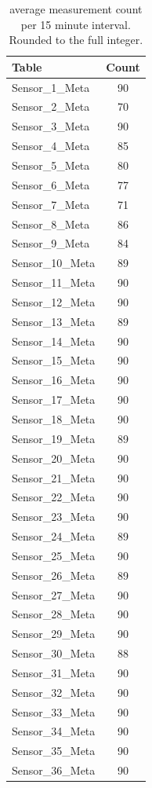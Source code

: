 \begin{table}
	\centering
	\begin{tabular}{l|c}
		Table & Count \\
		\hline
		 Sensor\_1\_Meta  & 90\\ \hline
		 Sensor\_2\_Meta  & 70\\ \hline
		 Sensor\_3\_Meta  & 90\\ \hline
		 Sensor\_4\_Meta  & 85\\ \hline
		 Sensor\_5\_Meta  & 80\\ \hline
		 Sensor\_6\_Meta  & 77\\ \hline
		 Sensor\_7\_Meta  & 71\\ \hline
		 Sensor\_8\_Meta  & 86\\ \hline
		 Sensor\_9\_Meta  & 84\\ \hline
		 Sensor\_10\_Meta  & 89\\ \hline
		 Sensor\_11\_Meta  & 90\\ \hline
		 Sensor\_12\_Meta  & 90\\ \hline
		 Sensor\_13\_Meta  & 89\\ \hline
		 Sensor\_14\_Meta  & 90\\ \hline
		 Sensor\_15\_Meta  & 90\\ \hline
		 Sensor\_16\_Meta  & 90\\ \hline
		 Sensor\_17\_Meta  & 90\\ \hline
		 Sensor\_18\_Meta  & 90\\ \hline
		 Sensor\_19\_Meta  & 89\\ \hline
		 Sensor\_20\_Meta  & 90\\ \hline 
		 Sensor\_21\_Meta  & 90\\ \hline
		 Sensor\_22\_Meta  & 90\\ \hline
		 Sensor\_23\_Meta  & 90\\ \hline
		 Sensor\_24\_Meta  & 89\\ \hline
		 Sensor\_25\_Meta  & 90\\ \hline
		 Sensor\_26\_Meta  & 89\\ \hline
		 Sensor\_27\_Meta  & 90\\ \hline
		 Sensor\_28\_Meta  & 90\\ \hline
		 Sensor\_29\_Meta  & 90\\ \hline
		 Sensor\_30\_Meta  & 88\\ \hline
		 Sensor\_31\_Meta  & 90\\ \hline
		 Sensor\_32\_Meta  & 90\\ \hline
		 Sensor\_33\_Meta  & 90\\ \hline
		 Sensor\_34\_Meta  & 90\\ \hline
		 Sensor\_35\_Meta  & 90\\ \hline
		 Sensor\_36\_Meta  & 90\\ \hline
	\end{tabular}
	\caption{average measurement count per 15 minute interval. Rounded to the full integer.}
	\label{tab:counts}
\end{table}

